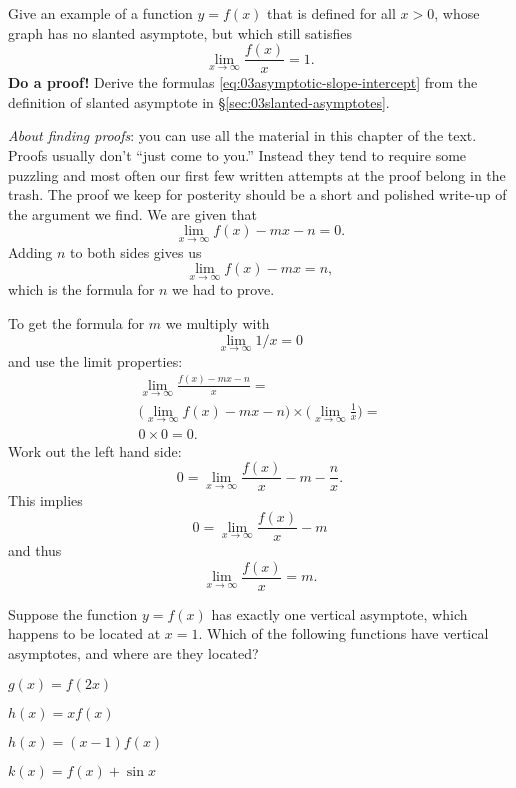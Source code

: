 \begin{multicols}{2}
\problem Give an example of a function $y=f(x)$ that is defined for 
all $x>0$, whose graph has no slanted asymptote, but which still satisfies
\[
\lim_{x\to\infty} \frac{f(x)}{x} = 1.
\]
\problem \textbf{Do a proof!}  Derive the formulas 
\eqref{eq:03asymptotic-slope-intercept}
\label{ex:prove-asymptotic-slope-intercept}
from the definition of slanted asymptote in
\S\ref{sec:03slanted-asymptotes}.

\textit{About finding proofs}:  you can use all the material in this chapter of
the text.  Proofs usually don't ``just come to you.'' Instead they tend to
require some puzzling and most often our first few written attempts at the proof
belong in the trash.  The proof we keep for posterity should be a short and
polished write-up of the argument we find.
\answer 
We are given that
\[
\lim_{x\to\infty} f(x) - mx-n = 0.
\]
Adding $n$ to both sides gives us
\[
\lim_{x\to\infty} f(x) -mx = n,
\]
which is the formula for $n$ we had to prove.

To get the formula for $m$ we multiply with
\[
\lim_{x\to\infty} 1/x =
0
\]
and use the limit properties:
\begin{multline*}
  \lim_{x\to\infty} \frac{f(x)-mx-n}{x} = \\
  \bigl(\lim_{x\to\infty} f(x)-mx-n\bigr)\times
  \bigl(\lim_{x\to\infty}\frac{1}{x}\bigr)=\\
  0\times0 = 0.
\end{multline*}
Work out the left hand side:
\[
0 = \lim_{x\to\infty} \frac{f(x)}{x} - m - \frac{n}{x}.
\]
This implies
\[
0 = \lim_{x\to\infty} \frac{f(x)}{x} - m
\]
and thus
\[
\lim_{x\to\infty} \frac{f(x)}{x} = m.
\]

\endanswer
\problem Suppose the function $y=f(x)$ has exactly one vertical 
asymptote, which happens to be located at $x=1$.  
Which of the following functions have vertical asymptotes, and where
are they located?

\subprob  $g(x) = f(2x)$

\subprob  $h(x) = xf(x)$

\subprob  $h(x) = (x-1)f(x)$

\subprob  $k(x) = f(x)+\sin x$

\end{multicols}
\noproblemfont
